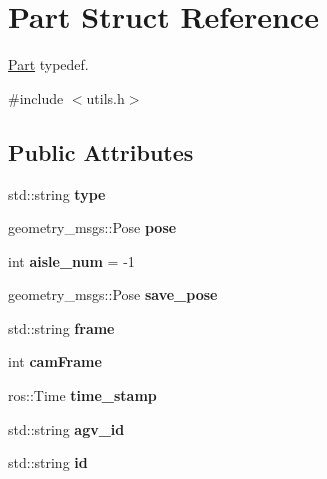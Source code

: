 \hypertarget{structPart}{}\section{Part Struct Reference}
\label{structPart}


\hyperlink{structPart}{Part} typedef.  




{\ttfamily \#include $<$utils.\+h$>$}

\subsection*{Public Attributes}
\begin{DoxyCompactItemize}
\item 
\mbox{\label{structPart_a8a7254c9b4d72b1e04e0b973ed26848e}} 
std\+::string {\bfseries type}
\item 
\mbox{\label{structPart_a67a8ee9f1aaecf76537554dbc429bca8}} 
geometry\+\_\+msgs\+::\+Pose {\bfseries pose}
\item 
\mbox{\label{structPart_a9115de5f8e5379328d3cd29ef4858c06}} 
int {\bfseries aisle\+\_\+num} = -\/1
\item 
\mbox{\label{structPart_ac1f55ac553e1680d2e38d0efdf567efa}} 
geometry\+\_\+msgs\+::\+Pose {\bfseries save\+\_\+pose}
\item 
\mbox{\label{structPart_a8576f0aea825bbc9e38e75e01528db9b}} 
std\+::string {\bfseries frame}
\item 
\mbox{\label{structPart_a2866479d106f0acfdcace4696457e584}} 
int {\bfseries cam\+Frame}
\item 
\mbox{\label{structPart_a2fbe1ce4e5592f01c28d6f63a41f337b}} 
ros\+::\+Time {\bfseries time\+\_\+stamp}
\item 
\mbox{\label{structPart_a1f40f960165087ee251323793dd229d3}} 
std\+::string {\bfseries agv\+\_\+id}
\item 
\mbox{\label{structPart_ac78dd973677ae60144acd1dd72a77e70}} 
std\+::string {\bfseries id}
\item 

\end{DoxyCompactItemize}
